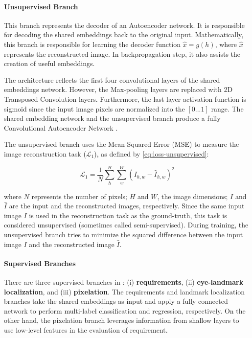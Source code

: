 \paragraph{Unsupervised Branch}
 
This branch represents the decoder of an Autoencoder network. It is responsible for decoding the shared embeddings back to the original input. Mathematically, this branch is responsible for learning the decoder function $\hat{x} = g(h)$, where $\hat{x}$ represents the reconstructed image. In backpropagation step, it also assists the creation of useful embeddings.
 
The architecture reflects the first four convolutional layers of the shared embeddings network. However, the Max-pooling layers are replaced with 2D Transposed Convolution layers. Furthermore, the last layer activation function is sigmoid since the input image pixels are normalized into the $[0...1]$ range. The shared embedding network and the unsupervised branch produce a fully Convolutional Autoencoder Network \citep{goodfellow2016deep}.
 
The unsupervised branch uses the Mean Squared Error (MSE) to measure the image reconstruction task ($\mathcal{L}_1$), as defined by \autoref{eq:loss-unsupervised}:
 
\begin{equation}
\label{eq:loss-unsupervised}
\mathcal{L}_1 = \frac{1}{N} \sum_h^H \sum_w^W ({I_{h,w} - \hat{I}_{h,w}})^2
\end{equation}
 
\noindent where $N$ represents the number of pixels; $H$ and $W$, the image dimensions; $I$ and $\hat{I}$ are the input and the reconstructed images, respectively. Since the same input image $I$ is used in the reconstruction task as the ground-truth, this task is considered unsupervised (sometimes called semi-supervised). During training, the unsupervised branch tries to minimize the squared difference between the input image $I$ and the reconstructed image $\hat{I}$.
 
\paragraph{Supervised Branches} \label{sec:supervisedbranches}
 
There are three supervised branches in \methodname: (i) \textbf{requirements}, (ii) \textbf{ eye-landmark localization}, and (iii) \textbf{pixelation}. The requirements and landmark localization branches take the shared embeddings as input and apply a fully connected network to perform multi-label classification and regression, respectively. On the other hand, the pixelation branch leverages information from shallow layers to use low-level features in the evaluation of \pixelation requirement. 
 
